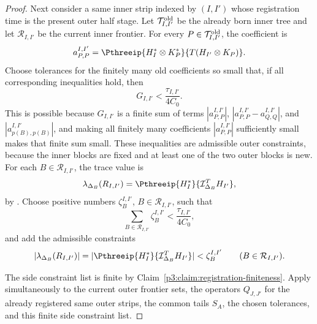 \documentclass[11pt,reqno]{amsart}
\makeatletter
\theoremstyle{plain}
\theoremstyle{definition}
\newcounter{problempaper}
\newenvironment{problempaperbody}{%
  \setcounter{subsection}{0}%
  \setcounter{subsubsection}{0}%
  \setcounter{paragraph}{0}%
  \renewcommand{\thesubsection}{\arabic{subsection}}%
  \renewcommand{\thesubsubsection}{\thesubsection.\arabic{subsubsection}}%
  \renewcommand{\theparagraph}{\thesubsubsection.\arabic{paragraph}}%
  \let\problem@outersection\section
  \let\problem@outersubsection\subsection
  \let\problem@outersubsubsection\subsubsection
  \let\problem@outerparagraph\paragraph
  \let\section\problem@papersection
  \let\subsection\problem@papersubsection
  \let\subsubsection\problem@papersubsubsection
}{%
  \let\section\problem@outersection
  \let\subsection\problem@outersubsection
  \let\subsubsection\problem@outersubsubsection
  \let\paragraph\problem@outerparagraph
}
\newcommand{\problem@target}[2]{%
  \hypertarget{problem-\theproblempaper-#1-#2}{}%
}
\newcommand{\problem@paperheading}[3]{%
  \par\bigskip
  \problem@target{#1}{#2}%
  \noindent{\large\bfseries #2.\quad #3\par}%
  \nobreak\smallskip
}
\newcommand{\problem@papersubheading}[3]{%
  \par\medskip
  \problem@target{#1}{#2}%
  \noindent{\normalsize\bfseries #2.\quad #3\par}%
  \nobreak\smallskip
}
\newcommand{\problem@papersubsubheading}[3]{%
  \par\smallskip
  \problem@target{#1}{#2}%
  \noindent{\normalsize\itshape #2.\quad #3.\ }%
}
\def\problem@papersection{%
  \@ifstar{\problem@papersectionstar}{\problem@papersectionnostar}%
}
\def\problem@papersectionstar#1{%
  \par\bigskip\noindent{\large\bfseries #1\par}\nobreak\smallskip
}
\def\problem@papersectionnostar#1{%
  \refstepcounter{subsection}%
  \setcounter{subsubsection}{0}%
  \setcounter{paragraph}{0}%
  \problem@paperheading{section}{\thesubsection}{#1}%
  \problem@writecontentsline{section}{\thesubsection}{#1}%
}
\def\problem@papersubsection{%
  \@ifstar{\problem@papersubsectionstar}{\problem@papersubsectionnostar}%
}
\def\problem@papersubsectionstar#1{%
  \par\medskip\noindent{\normalsize\bfseries #1\par}\nobreak\smallskip
}
\def\problem@papersubsectionnostar#1{%
  \refstepcounter{subsubsection}%
  \setcounter{paragraph}{0}%
  \problem@papersubheading{subsection}{\thesubsubsection}{#1}%
  \problem@writecontentsline{subsection}{\thesubsubsection}{#1}%
}
\def\problem@papersubsubsection{%
  \@ifstar{\problem@papersubsubsectionstar}{\problem@papersubsubsectionnostar}%
}
\def\problem@papersubsubsectionstar#1{%
  \par\smallskip\noindent{\normalsize\itshape #1.\ }%
}
\def\problem@papersubsubsectionnostar#1{%
  \refstepcounter{paragraph}%
  \problem@papersubsubheading{subsubsection}{\theparagraph}{#1}%
  \problem@writecontentsline{subsubsection}{\theparagraph}{#1}%
}
\newcommand{\problem@writecontentsline}[3]{%
  \begingroup
  \protected@write\@auxout{}{%
    \string\problemcontentsentry{\theproblempaper}{#1}{#2}{#3}{\thepage}%
  }%
  \endgroup
}
\newcommand{\problemcontentsentry}[5]{%
  \@ifundefined{problemcontents@#1}{%
    \expandafter\gdef\csname problemcontents@#1\endcsname{}%
  }{}%
  \expandafter\g@addto@macro\csname problemcontents@#1\endcsname{%
    \problemcontentsline{#1}{#2}{#3}{#4}{#5}%
  }%
}
\newcommand{\problemcontentslink}[4]{%
  \hyperlink{problem-#1-#2-#3}{#4}%
}
\newcommand{\problemcontentsline}[5]{%
  \ifstrequal{#2}{section}{%
    \par\noindent
    \problemcontentslink{#1}{#2}{#3}{\makebox[2.5em][l]{#3}#4}%
    \nobreak\dotfill
    \problemcontentslink{#1}{#2}{#3}{#5}\par
  }{%
    \ifstrequal{#2}{subsection}{%
      \par\noindent\hspace*{1.5em}%
      \problemcontentslink{#1}{#2}{#3}{\makebox[3.5em][l]{#3}#4}%
      \nobreak\dotfill
      \problemcontentslink{#1}{#2}{#3}{#5}\par
    }{%
      \par\noindent\hspace*{3em}%
      \problemcontentslink{#1}{#2}{#3}{\makebox[4.5em][l]{#3}#4}%
      \nobreak\dotfill
      \problemcontentslink{#1}{#2}{#3}{#5}\par
    }%
  }%
}
\makeatother
\begin{document}
\begin{problempaperbody}
\begin{proof}
Next consider a same inner strip indexed by $(I,I')$ whose registration time is the present outer half stage. Let $\mathcal T_{I,I'}^{\rm old}$ be the already born inner tree and let $\mathcal R_{I,I'}$ be the current inner frontier. For every $P\in\mathcal T_{I,I'}^{\rm old}$, the coefficient is
\begin{equation*}
        a_{P,P}^{I,I'}=\Pthreeip{H_I^*\otimes K_P^*}{T(H_{I'}\otimes K_P)}.
\end{equation*}
Choose tolerances for the finitely many old coefficients so small that, if all corresponding inequalities hold, then
\begin{equation*}
        G_{I,I'}<\frac{\tau_{I,I'}}{4C_0}.
\end{equation*}
This is possible because $G_{I,I'}$ is a finite sum of terms $|a_{P,P}^{I,I'}|$, $|a_{P,P}^{I,I'}-a_{Q,Q}^{I,I'}|$, and $|a_{p(B), p(B)}^{I,I'}|$, and making all finitely many coefficients $|a_{P,P}^{I,I'}|$ sufficiently small makes that finite sum small. These inequalities are admissible outer constraints, because the inner blocks are fixed and at least one of the two outer blocks is new. For each $B\in\mathcal R_{I,I'}$, the trace value is
\begin{equation*}
        \lambda_{\Delta_B}(R_{I,I'})=\Pthreeip{H_I^*}{\mathcal I_{\Delta_B}^T H_{I'}},
\end{equation*}
by . Choose positive numbers $\zeta_B^{I,I'}$, $B\in\mathcal R_{I,I'}$, such that
\begin{equation*}
        \sum_{B\in\mathcal R_{I,I'}}\zeta_B^{I,I'}<\frac{\tau_{I,I'}}{4C_0},
\end{equation*}
and add the admissible constraints
\begin{equation*}
        |\lambda_{\Delta_B}(R_{I,I'})| = |\Pthreeip{H_I^*}{\mathcal I_{\Delta_B}^T H_{I'}}| <\zeta_B^{I,I'}\qquad(B\in\mathcal R_{I,I'}).
\end{equation*}

The side constraint list is finite by Claim~\ref{p3:claim:registration-finiteness}. Apply  simultaneously to the current outer frontier sets, the operators $Q_{J,J'}$ for the already registered same outer strips, the common tails $S_A$, the chosen tolerances, and this finite side constraint list.


\end{proof}
\end{problempaperbody}
\end{document}
